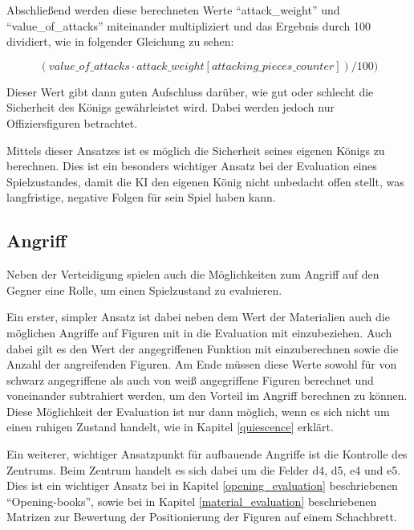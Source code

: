 Abschließend werden diese berechneten Werte ``attack\_weight'' und ``value\_of\_attacks'' miteinander multipliziert und das Ergebnis durch 100 dividiert, wie in folgender Gleichung zu sehen: \cite{O.V.2019b}

\begin{equation}
(value\_of\_attacks  \cdot  attack\_weight[attacking\_pieces\_counter]) / 100)
\end{equation}

Dieser Wert gibt dann guten Aufschluss darüber, wie gut oder schlecht die Sicherheit des Königs gewährleistet wird. Dabei werden jedoch nur Offiziersfiguren betrachtet.

Mittels dieser Ansatzes ist es möglich die Sicherheit seines eigenen Königs zu berechnen. Dies ist ein besonders wichtiger Ansatz bei der Evaluation eines Spielzustandes, damit die KI den eigenen König nicht unbedacht offen stellt, was langfristige, negative Folgen für sein Spiel haben kann. 


\subsection{Angriff}\label{offense_evaluation}

Neben der Verteidigung spielen auch die Möglichkeiten zum Angriff auf den Gegner eine Rolle, um einen Spielzustand zu evaluieren.

Ein erster, simpler Ansatz ist dabei neben dem Wert der Materialien auch die möglichen Angriffe auf Figuren mit in die Evaluation mit einzubeziehen. Auch dabei gilt es den Wert der angegriffenen Funktion mit einzuberechnen sowie die Anzahl der angreifenden Figuren. Am Ende müssen diese Werte sowohl für von schwarz angegriffene als auch von weiß angegriffene Figuren berechnet und voneinander subtrahiert werden, um den Vorteil im Angriff berechnen zu können. Diese Möglichkeit der Evaluation ist nur dann möglich, wenn es sich nicht um einen ruhigen Zustand handelt, wie in Kapitel \ref{quiescence} erklärt. 

Ein weiterer, wichtiger Ansatzpunkt für aufbauende Angriffe ist die Kontrolle des Zentrums. Beim Zentrum handelt es sich dabei um die Felder d4, d5, e4 und e5. Dies ist ein wichtiger Ansatz bei in Kapitel \ref{opening_evaluation} beschriebenen ``Opening-books'', sowie bei in Kapitel \ref{material_evaluation} beschriebenen Matrizen zur Bewertung der Positionierung der Figuren auf einem Schachbrett. 


